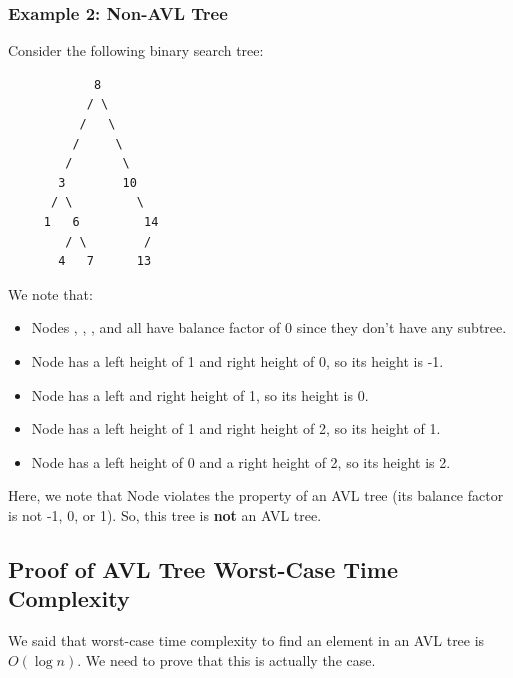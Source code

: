 \documentclass[letterpaper]{article}
\begin{document}
\subsubsection{Example 2: Non-AVL Tree}
Consider the following binary search tree: 
\begin{verbatim}
            8 
           / \ 
          /   \ 
         /     \
        /       \ 
       3        10
      / \         \ 
     1   6         14
        / \        /
       4   7      13
\end{verbatim}
We note that: 
\begin{itemize}
    \item Nodes , , , and  all have balance factor of 0 since they don't have any subtree. 
    \item Node  has a left height of 1 and right height of 0, so its height is -1. 
    \item Node  has a left and right height of 1, so its height is 0.
    \item Node  has a left height of 1 and right height of 2, so its height of 1. 
    \item Node  has a left height of 0 and a right height of 2, so its height is 2. 
\end{itemize}
Here, we note that Node \code{10} violates the property of an AVL tree (its balance factor is not -1, 0, or 1). So, this tree is \textbf{not} an AVL tree. 


\subsection{Proof of AVL Tree Worst-Case Time Complexity}
We said that worst-case time complexity to find an element in an AVL tree is $O(\log n)$. We need to prove that this is actually the case. 
\end{document}
